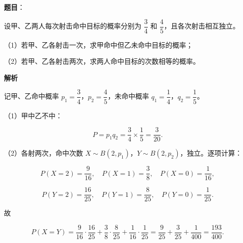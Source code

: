 \begin{answer}

\textbf{题目}：

设甲、乙两人每次射击命中目标的概率分别为 $\dfrac34$ 和 $\dfrac45$，且各次射击相互独立。

（1）若甲、乙各射击一次，求甲命中但乙未命中目标的概率；

（2）若甲、乙各射击两次，求两人命中目标的次数相等的概率。

\textbf{解析}

记甲、乙命中概率 $p_1=\dfrac34$，$p_2=\dfrac45$，未命中概率 $q_1=\dfrac14$，$q_2=\dfrac15$。

（1）甲中乙不中：

\nopagebreak[4]
\[P=p_1q_2=\frac34\times\frac15=\frac3{20}.\]

（2）各射两次，命中次数 $X\sim B(2,p_1)$，$Y\sim B(2,p_2)$，独立。逐项计算：

\nopagebreak[4]
\[P(X=2)=\frac9{16},\quad P(X=1)=\frac38,\quad P(X=0)=\frac1{16},\]

\nopagebreak[4]
\[P(Y=2)=\frac{16}{25},\quad P(Y=1)=\frac8{25},\quad P(Y=0)=\frac1{25}.\]

故

\nopagebreak[4]
\[P(X=Y)=\frac9{16}\cdot\frac{16}{25}+\frac38\cdot\frac8{25}+\frac1{16}\cdot\frac1{25}
=\frac9{25}+\frac3{25}+\frac1{400}=\frac{193}{400}.\]


\end{answer}
